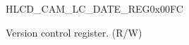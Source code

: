 \begin{register}{H}{LCD\_CAM\_LC\_DATE\_REG}{0x00FC}\label{regdesc:LCDCAMLCREGDATEREG}
%
%
\regnewline%
\begin{regdesc}\begin{reglist}
\label{fielddesc:LCDCAMLCDATE}\item [LCD\_CAM\_LC\_DATE] Version control register. (R/W)
\end{reglist}\end{regdesc}
\end{register}
